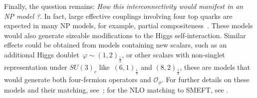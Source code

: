 \par	Finally, the question remains: \textit{How this interconnectivity would manifest in an NP model ?}. In fact, large effective couplings involving four top quarks are expected in many NP models, for example, partial compositeness~\cite{Banelli:2020iau}. These models would also generate sizeable modifications to the Higgs self-interaction. Similar effects could be obtained from models containing new scalars, such as an additional Higgs doublet~$\varphi\sim (1,2)_{\frac 12}$, or other scalars with non-singlet representation under $SU(3)_c$ like~$(6,1)_{\frac 1 3}$ and $(8,2)_{\frac 1 2}$, these are models that would generate both four-fermion operators and $\mathcal{O}_\phi$. For further details on these models and their matching, see~\cite{deBlas:2017xtg}; for the NLO matching to SMEFT, see \cite{Anisha:2021hgc}. 